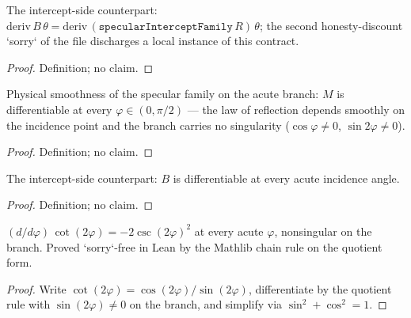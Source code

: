 \begin{definition}
\label{def:IPhO2026Problems_problem_IPhO_2026_2_C_2:interceptFamily_deriv}
The intercept-side counterpart:
$\mathrm{deriv}\,B\,\theta =
\mathrm{deriv}\,(\texttt{specularInterceptFamily}\,R)\,\theta$;
the second honesty-discount `sorry` of the file discharges a local
instance of this contract.
\end{definition}
\begin{proof}
Definition; no claim.
\end{proof}

\begin{definition}
\label{def:IPhO2026Problems_problem_IPhO_2026_2_C_2:slopeFamily_smooth}
Physical smoothness of the specular family on the acute branch:
$M$ is differentiable at every $\varphi \in (0, \pi/2)$ --- the law of
reflection depends smoothly on the incidence point and the branch carries
no singularity ($\cos\varphi \ne 0$, $\sin 2\varphi \ne 0$).
\end{definition}
\begin{proof}
Definition; no claim.
\end{proof}

\begin{definition}
\label{def:IPhO2026Problems_problem_IPhO_2026_2_C_2:interceptFamily_smooth}
The intercept-side counterpart: $B$ is differentiable at every acute
incidence angle.
\end{definition}
\begin{proof}
Definition; no claim.
\end{proof}

\begin{lemma}
\label{lem:IPhO2026Problems_problem_IPhO_2026_2_C_2:deriv_specularSlopeFamily}
$(d/d\varphi)\,\cot(2\varphi) = -2\csc(2\varphi)^{2}$ at every acute
$\varphi$, nonsingular on the branch.  Proved `sorry`-free in Lean by the
Mathlib chain rule on the quotient form.
\end{lemma}
\begin{proof}
Write $\cot(2\varphi) = \cos(2\varphi)/\sin(2\varphi)$, differentiate by
the quotient rule with $\sin(2\varphi) \ne 0$ on the branch, and simplify
via $\sin^{2} + \cos^{2} = 1$.
\end{proof}

